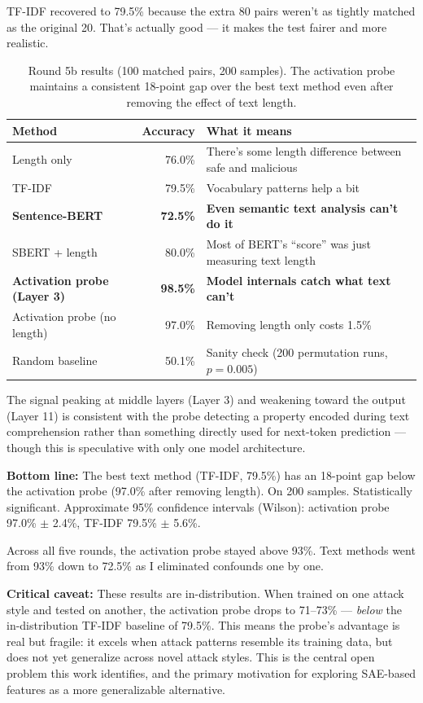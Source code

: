 \documentclass[11pt]{article}
\begin{document}
TF-IDF recovered to 79.5\% because the extra 80 pairs weren't as tightly matched as the original 20. That's actually good --- it makes the test fairer and more realistic.

\begin{table}[h]
\centering
\begin{tabular}{@{}lrl@{}}
\toprule
Method & Accuracy & What it means \\
\midrule
Length only & 76.0\% & There's some length difference between safe and malicious \\
TF-IDF & 79.5\% & Vocabulary patterns help a bit \\
\textbf{Sentence-BERT} & \textbf{72.5\%} & \textbf{Even semantic text analysis can't do it} \\
SBERT + length & 80.0\% & Most of BERT's ``score'' was just measuring text length \\
\textbf{Activation probe (Layer 3)} & \textbf{98.5\%} & \textbf{Model internals catch what text can't} \\
Activation probe (no length) & 97.0\% & Removing length only costs 1.5\% \\
Random baseline & 50.1\% & Sanity check (200 permutation runs, $p=0.005$) \\
\bottomrule
\end{tabular}
\caption{Round 5b results (100 matched pairs, 200 samples). The activation probe maintains a consistent 18-point gap over the best text method even after removing the effect of text length.}
\label{tab:round5b}
\end{table}

The signal peaking at middle layers (Layer 3) and weakening toward the output (Layer 11) is consistent with the probe detecting a property encoded during text comprehension rather than something directly used for next-token prediction --- though this is speculative with only one model architecture.

\textbf{Bottom line:} The best text method (TF-IDF, 79.5\%) has an 18-point gap below the activation probe (97.0\% after removing length). On 200 samples. Statistically significant. Approximate 95\% confidence intervals (Wilson): activation probe 97.0\% $\pm$ 2.4\%, TF-IDF 79.5\% $\pm$ 5.6\%.

Across all five rounds, the activation probe stayed above 93\%. Text methods went from 93\% down to 72.5\% as I eliminated confounds one by one.

\textbf{Critical caveat:} These results are in-distribution. When trained on one attack style and tested on another, the activation probe drops to 71--73\% --- \emph{below} the in-distribution TF-IDF baseline of 79.5\%. This means the probe's advantage is real but fragile: it excels when attack patterns resemble its training data, but does not yet generalize across novel attack styles. This is the central open problem this work identifies, and the primary motivation for exploring SAE-based features as a more generalizable alternative.
\end{document}
